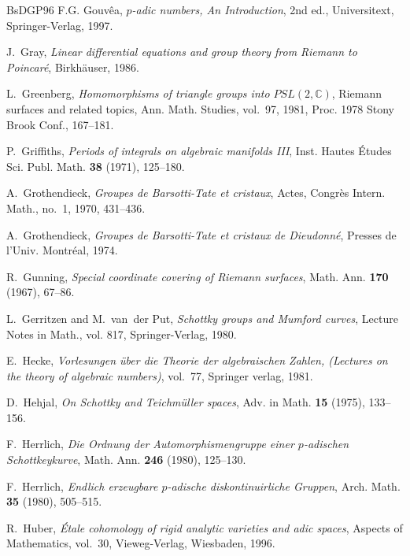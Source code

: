 \begin{thebibliography}{BsDGP96}
F.G. Gouv\^{e}a, \emph{$p$-adic numbers, {A}n {I}ntroduction}, 2nd ed.,
  Universitext, Springer-Verlag, 1997.

J.~Gray, \emph{Linear differential equations and group theory from {R}iemann to
  {P}oincar\'e}, Birkh\"auser, 1986.

L.~Greenberg, \emph{Homomorphisms of triangle groups into
  ${P}{S}{L}(2,\mathbb{C})$}, Riemann surfaces and related topics, Ann. Math.
  Studies, vol.~97, 1981, Proc. 1978 Stony Brook Conf., 167--181.

P.~Griffiths, \emph{Periods of integrals on algebraic manifolds {I}{I}{I}},
  Inst. Hautes {\'E}tudes Sci. Publ. Math. \textbf{38} (1971), 125--180.

A.~Grothendieck, \emph{Groupes de Barsotti-Tate et cristaux}, Actes, Congr\`es
  Intern. Math., no.~1, 1970, 431--436.

A.~Grothendieck, \emph{Groupes de Barsotti-Tate et cristaux de Dieudonn\'e},
  Presses de l'Univ. Montr\'eal, 1974.

R.~Gunning, \emph{Special coordinate covering of {R}iemann surfaces}, Math.
  Ann. \textbf{170} (1967), 67--86.

L.~Gerritzen and M.~van~der Put, \emph{Schottky groups and Mumford curves},
  Lecture Notes in Math., vol. 817, Springer-Verlag, 1980.

E.~Hecke, \emph{Vorlesungen \"uber die Theorie der algebraischen Zahlen,
  (Lectures on the theory of algebraic numbers)}, vol.~77, Springer verlag,
  1981.

D.~Hehjal, \emph{On {S}chottky and {T}eichm\"uller spaces}, Adv. in Math.
  \textbf{15} (1975), 133--156.

F.~Herrlich, \emph{Die {O}rdnung der {A}utomorphismengruppe einer $p$-adischen
  {S}chottkeykurve}, Math. Ann. \textbf{246} (1980), 125--130.

F.~Herrlich, \emph{Endlich erzeugbare $p$-adische diskontinuirliche {G}ruppen},
  Arch. Math. \textbf{35} (1980), 505--515.

R.~Huber, \emph{\'{E}tale cohomology of rigid analytic varieties and adic
  spaces}, Aspects of Mathematics, vol.~30, Vieweg-Verlag, Wiesbaden, 1996.


\end{thebibliography}
